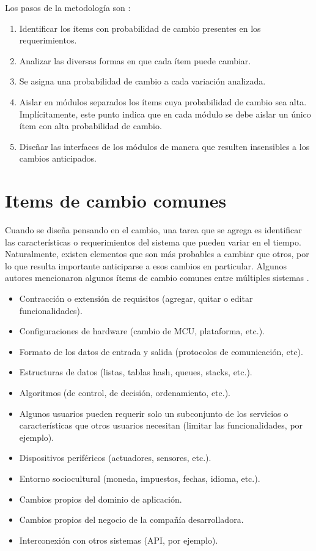 Los pasos de la metodología son \cite{Parnas02, cristia2022diseno}:

\begin{enumerate}
	\item Identificar los ítems con probabilidad de cambio presentes en los requerimientos.
	\item Analizar las diversas formas en que cada ítem puede cambiar.
	\item Se asigna una probabilidad de cambio a cada variación analizada.
	\item Aislar en módulos separados los ítems cuya probabilidad de cambio sea alta. Implícitamente, este punto indica que en cada módulo se debe aislar un único ítem con alta probabilidad de cambio.
	\item Diseñar las interfaces de los módulos de manera que resulten insensibles a los cambios anticipados.

\end{enumerate}


\section{Items de cambio comunes}
\label{listaItems}

Cuando se diseña pensando en el cambio, una tarea que se agrega es identificar las características o requerimientos del sistema que pueden variar en el tiempo. Naturalmente, existen elementos que son más probables a cambiar que otros, por lo que resulta importante anticiparse a esos cambios en particular. Algunos autores mencionaron algunos ítems de cambio comunes entre múltiples sistemas \cite{Parnas02, cristia2022diseno}.

\begin{itemize}
	\item Contracción o extensión de requisitos (agregar, quitar o editar funcionalidades).
	\item Configuraciones de hardware (cambio de \gls{MCU}, plataforma, etc.).
	\item Formato de los datos de entrada y salida (protocolos de comunicación, etc).
	\item Estructuras de datos (listas, tablas hash, queues, stacks, etc.).
	\item Algoritmos (de control, de decisión, ordenamiento, etc.).
	\item Algunos usuarios pueden requerir solo un subconjunto de los servicios o características que otros usuarios necesitan (limitar las funcionalidades, por ejemplo).
	\item Dispositivos periféricos (actuadores, sensores, etc.).
	\item Entorno sociocultural (moneda, impuestos, fechas, idioma, etc.).
	\item Cambios propios del dominio de aplicación.
	\item Cambios propios del negocio de la compañía desarrolladora.
	\item Interconexión con otros sistemas (\gls{API}, por ejemplo).
\end{itemize}

